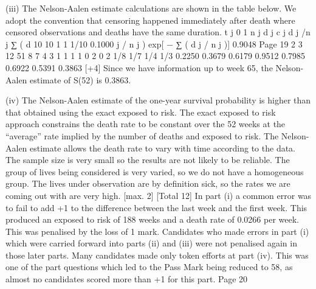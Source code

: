 \documentclass[a4paper,12pt]{article}
\begin{document}
(iii)
The Nelson-Aalen estimate calculations are shown in the table below.
We adopt the convention that censoring happened immediately after
death where censored observations and deaths have the same duration.
t j
0
1
n j d j c j d j /n j ∑ ( d
10
10 1 1 1/10 0.1000
j
/ n j ) exp[ − ∑ ( d j / n j )]
0.9048
Page 19
2
3
12
51
8
7
4
3
1
1
1
1
0
2
0
2
1/8
1/7
1/4
1/3
0.2250
0.3679
0.6179
0.9512
0.7985
0.6922
0.5391
0.3863
[+4]
Since we have information up to week 65, 
the Nelson-Aalen estimate of S(52) is 0.3863. 

(iv)
The Nelson-Aalen estimate of the one-year survival probability is
higher than that obtained using the exact exposed to risk. 
The exact exposed to risk approach constrains the death rate
to be constant over the 52 weeks at the “average” rate implied by the
number of deaths and exposed to risk. 
The Nelson-Aalen estimate allows the death rate to vary with time
according to the data. 
The sample size is very small so the results are not likely to be
reliable. 
The group of lives being considered is very varied, so we do not
have a homogeneous group. 
The lives under observation are by definition sick, so the rates
we are coming out with are very high. 
[max. 2]
[Total 12]
In part (i) a common error was to fail to add +1 to the
difference between the last week and the first week. This
produced an exposed to risk of 188 weeks and a death rate
of 0.0266 per week. This was penalised by the loss of 1
mark. Candidates who made errors in part (i) which were
carried forward into parts (ii) and (iii) were not penalised
again in those later parts. Many candidates made only
token efforts at part (iv). This was one of the part questions
which led to the Pass Mark being reduced to 58, as almost
no candidates scored more than +1 for this part.
Page 20
\end{document}
